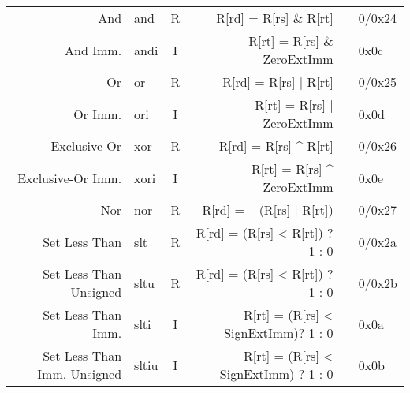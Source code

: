 \begin{tabularx}{\textwidth}{NMcDcO}
    \midrule
    And                                                 & and                                      & R & R[rd] = R[rs] \& R[rt]                                &                                  & 0/0x24 \\
    And Imm.                                            & andi                                     & I & R[rt] = R[rs] \& ZeroExtImm                           & \footnotemark[3]                 & 0x0c   \\
    Or                                                  & or                                       & R & R[rd] = R[rs] | R[rt]                                 &                                  & 0/0x25 \\
    Or Imm.                                             & ori                                      & I & R[rt] = R[rs] | ZeroExtImm                            & \footnotemark[3]                 & 0x0d   \\
    Exclusive-Or                                        & xor                                      & R & R[rd] = R[rs] \textasciicircum{} R[rt]                &                                  & 0/0x26 \\
    Exclusive-Or Imm.                                   & xori                                     & I & R[rt] = R[rs] \textasciicircum{} ZeroExtImm           & \footnotemark[3]                 & 0x0e   \\
    Nor                                                 & nor                                      & R & R[rd] = ~ (R[rs] | R[rt])                             &                                  & 0/0x27 \\
    \midrule
    Set Less Than                                       & slt                                      & R & R[rd] = (R[rs] < R[rt]) ? 1 : 0                       &                                  & 0/0x2a \\
    Set Less Than Unsigned                              & sltu                                     & R & R[rd] = (R[rs] < R[rt]) ? 1 : 0                       & \footnotemark[6]                 & 0/0x2b \\
    Set Less Than Imm.                                  & slti                                     & I & R[rt] = (R[rs] < SignExtImm)? 1 : 0                   & \footnotemark[2]                 & 0x0a   \\
    Set Less Than Imm. Unsigned                         & sltiu                                    & I & R[rt] = (R[rs] < SignExtImm) ? 1 : 0                  & \footnotemark[2]\footnotemark[6] & 0x0b   \\

\end{tabularx}
